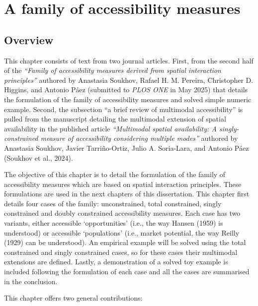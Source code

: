 \documentclass[
11pt, %
oneside, %
english, %
singlespacing, %
]{macthesis} %
\begin{document}
\chapter{A family of accessibility measures}\label{a-family-of-accessibility-measures}

\section{Overview}\label{overview-2}

This chapter consists of text from two journal articles. First, from the second half of the \emph{``Family of accessibility measures derived from spatial interaction principles''} authored by Anastasia Soukhov, Rafael H. M. Pereira, Christopher D. Higgins, and Antonio Páez (submitted to \emph{PLOS ONE} in May 2025) that details the formulation of the family of accessibility measures and solved simple numeric example. Second, the subsection ``a brief review of multimodal accessibility'' is pulled from the manuscript detailing the multimodal extension of spatial availability in the published article \emph{``Multimodal spatial availability: A singly-constrained measure of accessibility considering multiple modes''} authored by Anastasia Soukhov, Javier Tarriño-Ortiz, Julio A. Soria-Lara, and Antonio Páez (Soukhov et al., 2024).

The objective of this chapter is to detail the formulation of the family of accessibility measures which are based on spatial interaction principles. These formulations are used in the next chapters of this dissertation.
This chapter first details four cases of the family: unconstrained, total constrained, singly constrained and doubly constrained accessibility measures. Each case has two variants, either accessible `opportunities' (i.e., the way Hansen (1959) is understood) or accessible `populations' (i.e., market potential, the way Reilly (1929) can be understood). An empirical example will be solved using the total constrained and singly constrained cases, so for these cases their multimodal extensions are defined. Lastly, a demonstration of a solved toy example is included following the formulation of each case and all the cases are summarised in the conclusion.

This chapter offers two general contributions:
\end{document}
